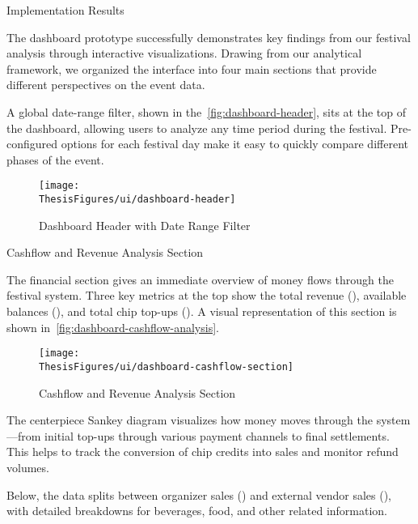 \begin{section}{Implementation Results}
	\label{sec:implementation-results}

	The dashboard prototype successfully demonstrates key findings from our festival analysis through interactive visualizations.
	Drawing from our analytical framework, we organized the interface into four main sections that provide different perspectives on the event data.

	A global date-range filter, shown in the~\autoref{fig:dashboard-header}, sits at the top of the dashboard, allowing users to analyze any time period during the festival.
	Pre-configured options for each festival day make it easy to quickly compare different phases of the event.

	\begin{figure}[H]
		\centering
		\texttt{[image: \\ThesisFigures/ui/dashboard-header]}
		\caption{Dashboard Header with Date Range Filter}
		\label{fig:dashboard-header}
		\source
	\end{figure}

	\begin{subsection}{Cashflow and Revenue Analysis Section}
		\label{subsec:implementation-results-structure-cashflow}

		The financial section gives an immediate overview of money flows through the festival system.
		Three key metrics at the top show the total revenue (), available balances (), and total chip top-ups ().
		A visual representation of this section is shown in~\autoref{fig:dashboard-cashflow-analysis}.

		\begin{figure}[h]
			\centering
			\texttt{[image: \\ThesisFigures/ui/dashboard-cashflow-section]}
			\caption{Cashflow and Revenue Analysis Section}
			\source
			\label{fig:dashboard-cashflow-analysis}
		\end{figure}

		The centerpiece Sankey diagram visualizes how money moves through the system—from initial top-ups through various payment channels to final settlements.
		This helps to track the conversion of chip credits into sales and monitor refund volumes.

		Below, the data splits between organizer sales () and external vendor sales (), with detailed breakdowns for beverages, food, and other related information.
	\end{subsection}


\end{section}
